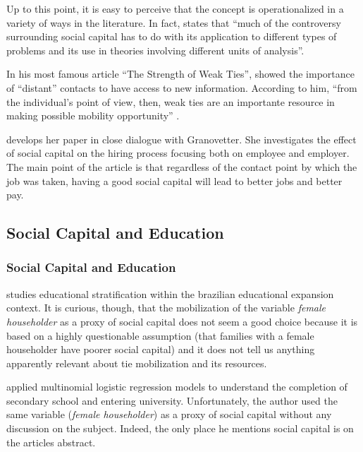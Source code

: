 \documentclass[compress]{beamer}
\begin{document}
\begin{frame}

	
	\begin{alertblock}{Up to this point,}
	it is easy to perceive that the concept is operationalized in a variety of ways in the literature. In fact,  states that ``much of the controversy surrounding social capital has to do with its application to different types of problems and its use in theories involving different units of analysis''.
	\end{alertblock}
	
\end{frame}

\begin{frame}
	\justify
	In his most famous article ``The Strength of Weak Ties'',  showed the importance of ``distant'' contacts to have access to new information. According to him, ``from  the  individual's  point  of  view,  then,  weak  ties  are  an  importante resource in making possible mobility opportunity'' \cite[p. 1373]{granovetter1973strength}.
	
	\vspace{3mm}
	
	 develops her paper in close dialogue with Granovetter. She investigates the effect of social capital on the hiring process focusing both on employee and employer. The main point of the article is that regardless of the contact point by which the job was taken, having a good social capital will lead to better jobs and better pay.
\end{frame}


\subsection{Social Capital and Education}
\begin{frame}
	\frametitle{Social Capital and Education}
	
	\justify
	
	 studies educational stratification within the brazilian educational expansion context. It is curious, though, that the mobilization of the variable \textit{female householder} as a proxy of social capital does not seem a good choice because it is based on a highly questionable assumption (that families with a female householder have poorer social capital) and it does not tell us anything apparently relevant about tie mobilization and its resources.
	
	\vspace{3mm}
	
	 applied multinomial logistic regression models to understand the completion of secondary school and entering university. Unfortunately, the author used the same variable (\textit{female householder}) as a proxy of social capital without any discussion on the subject. Indeed, the only place he mentions social capital is on the articles abstract.
\end{frame}
\end{document}
